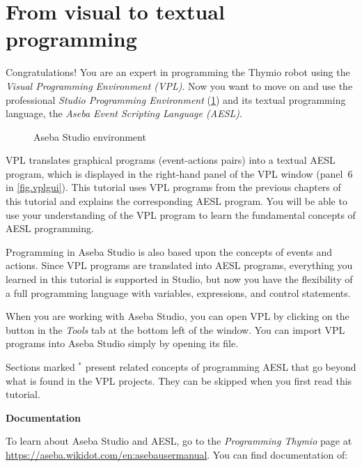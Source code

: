 \part{From visual to textual programming}

\label{ch.next}


Congratulations! You are an expert in programming the Thymio robot using
the \textit{Visual Programming Environment (VPL)}. Now you want to move
on and use the professional \textit{Studio Programming Environment}
(\cref{fig.studio}) and its textual programming language, the
\textit{Aseba Event Scripting Language (AESL)}.

\begin{figure}[hbt]
\begin{center}
\caption{Aseba Studio environment}\label{fig.studio}
\end{center}
\end{figure}

VPL translates graphical programs (event-actions pairs) into a textual
AESL program, which is displayed in the right-hand panel of the VPL
window (panel~6 in \cref{fig.vplgui}). This tutorial uses VPL programs
from the previous chapters of this tutorial and explains the
corresponding AESL program. You will be able to use your understanding
of the VPL program to learn the fundamental concepts of AESL
programming.

Programming in Aseba Studio is also based upon the concepts of events
and actions. Since VPL programs are translated into AESL programs,
everything you learned in this tutorial is supported in Studio, but now
you have the flexibility of a full programming language with variables,
expressions, and control statements.

When you are working with Aseba Studio, you can open VPL by clicking on
the button  in the \emph{Tools} tab at the bottom left of
the window. You can import VPL programs into Aseba Studio simply by
opening its file.

Sections marked $^*$ present related concepts of programming AESL that
go beyond what is found in the VPL projects. They can be skipped when
you first read this tutorial.

\newpage

\textbf{\large Documentation}

To learn about Aseba Studio and AESL, go to the \emph{Programming
Thymio} page at\\
\href{https://aseba.wikidot.com/en:asebausermanual}{https://aseba.wikidot.com/en:asebausermanual}.
You can find documentation of:

